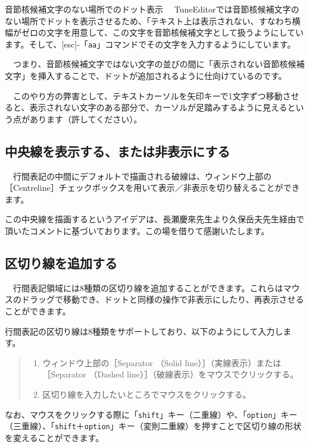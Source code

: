 \begin{itembox}[l]
{\textsf{音節核候補文字のない場所でのドット表示}}
　TuneEditorでは音節核候補文字のない場所でドットを表示させるため、「テキスト上は表示されない、すなわち\textsf{横幅がゼロ}の文字を用意して、この文字を音節核候補文字として扱うようにしています。そして、[esc]-「\texttt{aa}」コマンドでその文字を入力するようにしています。

\bigskip
　つまり、音節核候補文字ではない文字の並びの間に「表示されない音節核候補文字」を挿入することで、ドットが追加されるように仕向けているのです。

\bigskip
　このやり方の弊害として、テキストカーソルを矢印キーで1文字ずつ移動させると、表示されない文字のある部分で、カーソルが足踏みするように見えるという点があります（許してください）。
\end{itembox}


\subsection{中央線を表示する、または非表示にする}

　行間表記の中間にデフォルトで描画される破線は、ウィンドウ上部の［Centreline］チェックボックスを用いて表示／非表示を切り替えることができます。

この中央線を描画するというアイデアは、長瀬慶來先生より久保岳夫先生経由で頂いたコメントに基づいております。この場を借りて感謝いたします。

\subsection{区切り線を追加する}

　行間表記領域には8種類の区切り線を追加することができます。これらはマウスのドラッグで移動でき、ドットと同様の操作で非表示にしたり、再表示させることができます。

行間表記の区切り線は8種類をサポートしており、以下のようにして入力します。

\begin{quote}
\begin{enumerate}
\item ウィンドウ上部の［Separator （Solid line）］（実線表示）または［Separator （Dashed line）］（破線表示）をマウスでクリックする。
\item 区切り線を入力したいところでマウスをクリックする。
\end{enumerate}
\end{quote}

なお、マウスをクリックする際に「\texttt{shift}」キー（二重線）や、「\texttt{option}」キー（三重線）、「\texttt{shift}＋\texttt{option}」キー（変則二重線）を押すことで区切り線の形状を変えることができます。

